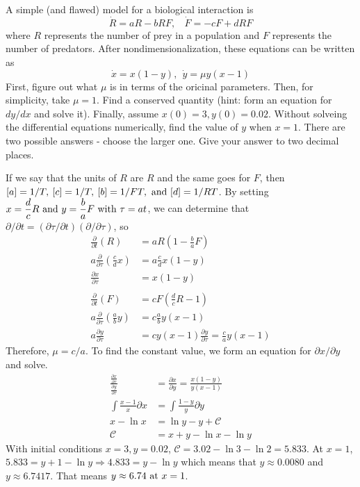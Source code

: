 \documentclass{article}
\begin{document}
\newline A simple (and flawed) model for a biological interaction is
\[
\dot{R} = aR - bRF, \:\:\:\: \dot{F} = -cF + dRF
\]
where $R$ represents the number of prey in a population and $F$ represents the number of predators.  After nondimensionalization, these equations can be written as
\[
\dot{x} = x(1 - y), \:\: \dot{y} = \mu y(x - 1)
\]
First, figure out what $\mu$ is in terms of the oricinal parameters.  Then, for simplicity, take $\mu = 1$. Find a conserved quantity (hint: form an equation for $dy/dx$ and solve it).  Finally, assume $x(0) = 3, y(0) = 0.02$.  Without solveing the differential equations numerically, find the value of $y$ when $x = 1$.  There are two possible answers - choose the larger one.  Give your answer to two decimal places.

\hangindent=20pt
\vspace{20pt}
\newline If we say that the units of $R$ are $R$ and the same goes for $F$, then $[a] = 1/T, \: [c] = 1/T, \: [b] = 1/FT, \hbox{ and } [d] = 1/RT$.  By setting $\displaystyle x = \frac{d}{c}R \hbox{ and } y = \frac{b}{a}F \hbox{ with } \tau = at$, we can determine that $\displaystyle \partial/\partial{t} = (\partial{\tau}/\partial{t})(\partial/\partial{\tau})$, so
\begin{align*}
    \frac{\partial}{\partial{t}}(R) &= aR(1 - \frac{b}{a}F) \\
    a \frac{\partial}{\partial{\tau}}\left( \frac{c}{d} x \right) &= a\frac{c}{d}x(1 - y) \\
    \frac{\partial{x}}{\partial{\tau}} &= x(1 - y) \\
    \\
    \frac{\partial}{\partial{t}}(F) &= cF\left( \frac{d}{c}R - 1 \right) \\
    a\frac{\partial}{\partial{\tau}}\left(\frac{a}{b}y\right) &= c\frac{a}{b}y(x - 1)\\
    a\frac{\partial{y}}{\partial{\tau}} &= cy(x-1)
    \frac{\partial{y}}{\partial{\tau}} = \frac{c}{a}y(x-1)
\end{align*}
Therefore, $\mu = c/a$.  To find the constant value, we form an equation for $\partial{x}/\partial{y}$ and solve.
\begin{align*}
    \frac{\frac{\partial{x}}{\partial{\tau}}}{\frac{\partial{y}}{\partial{\tau}}} &= \frac{\partial{x}}{\partial{y}} = \frac{x(1 - y)}{y(x-1)}\\
    \int \frac{x-1}{x}\partial{x} &= \int \frac{1-y}{y}\partial{y} \\
    x - \ln{x} & = \ln{y} - y + \mathcal{C}\\
    \mathcal{C} &= x + y - \ln{x} -\ln{y}
\end{align*}
With initial conditions $x = 3, y = 0.02$, $\mathcal{C} = 3.02 - \ln{3} - \ln{2} = 5.833$.  At $x = 1$, $5.833 = y + 1 - \ln{y} \Rightarrow 4.833 = y - \ln{y}$ which means that $y \approx 0.0080$ and $y \approx 6.7417$.  That means $y \approx 6.74 \hbox{ at } x = 1$.
\pagebreak
\end{document}
